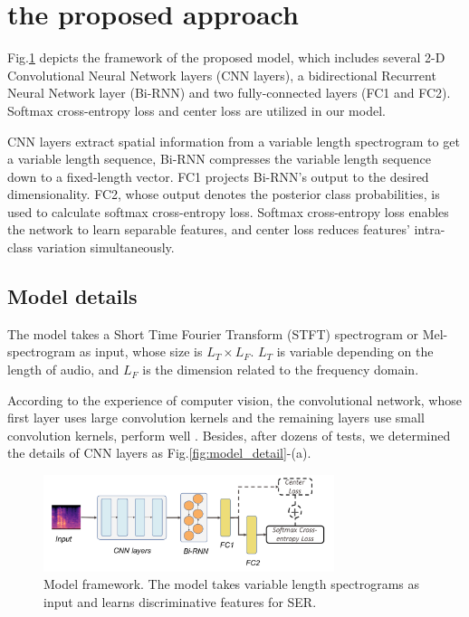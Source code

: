 \documentclass{article}
\begin{document}
\section{the proposed approach}




Fig.\ref{fig:model-framework} depicts the framework of the proposed model, which includes several 2-D Convolutional Neural Network layers ({CNN layers}), a bidirectional Recurrent Neural Network layer ({Bi-RNN}) and two fully-connected layers (FC1 and FC2). Softmax cross-entropy loss and center loss are utilized in our model.

CNN layers extract spatial information from a variable length spectrogram to get a variable length sequence, Bi-RNN compresses the variable length sequence down to a fixed-length vector. FC1 projects Bi-RNN's output to the desired dimensionality. FC2, whose output denotes the posterior class probabilities, is used to calculate softmax cross-entropy loss. Softmax cross-entropy loss enables the network to learn separable features, and center loss reduces features' intra-class variation simultaneously.
\subsection{Model details}
\label{ssec:model-detail}
The model takes a Short Time Fourier Transform ({STFT}) spectrogram or Mel-spectrogram as input, whose size is $L_T \times L_F$. $L_T$ is variable depending on the length of audio, and $L_F$ is the dimension related to the frequency domain.

According to the experience of computer vision, the convolutional network, whose first layer uses large convolution kernels and the remaining layers use small convolution kernels, perform well \cite{simonyan2014very, He2015Deep}. Besides, after dozens of tests, we determined the details of CNN layers as Fig.\ref{fig:model_detail}-(a).

\begin{figure}[htb]
	
	\begin{minipage}[b]{1.0\linewidth}
		\centerline{\includegraphics[width=8.5cm]{fig1}}
	\end{minipage}
	\caption{Model framework. The model takes variable length spectrograms as input and learns discriminative features for SER.}
	\label{fig:model-framework}
\end{figure}
\end{document}
